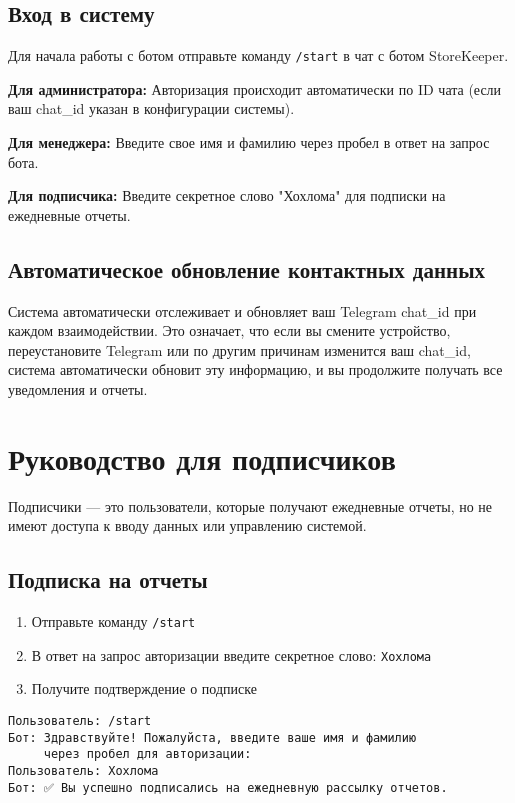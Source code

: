 \documentclass[a4paper,12pt]{article}
\begin{document}
\subsection{Вход в систему}
Для начала работы с ботом отправьте команду \texttt{/start} в чат с ботом StoreKeeper.

\begin{tcolorbox}[colback=gray!10, title=Авторизация]
\textbf{Для администратора:} Авторизация происходит автоматически по ID чата (если ваш chat\_id указан в конфигурации системы).

\textbf{Для менеджера:} Введите свое имя и фамилию через пробел в ответ на запрос бота.

\textbf{Для подписчика:} Введите секретное слово "Хохлома" для подписки на ежедневные отчеты.
\end{tcolorbox}

\subsection{Автоматическое обновление контактных данных}
Система автоматически отслеживает и обновляет ваш Telegram chat\_id при каждом взаимодействии. Это означает, что если вы смените устройство, переустановите Telegram или по другим причинам изменится ваш chat\_id, система автоматически обновит эту информацию, и вы продолжите получать все уведомления и отчеты.

\section{Руководство для подписчиков}

Подписчики — это пользователи, которые получают ежедневные отчеты, но не имеют доступа к вводу данных или управлению системой.

\subsection{Подписка на отчеты}
\begin{enumerate}
    \item Отправьте команду \texttt{/start}
    \item В ответ на запрос авторизации введите секретное слово: \texttt{Хохлома}
    \item Получите подтверждение о подписке
\end{enumerate}

\begin{tcolorbox}[colback=blue!5, title=Пример подписки]
\begin{verbatim}
Пользователь: /start
Бот: Здравствуйте! Пожалуйста, введите ваше имя и фамилию 
     через пробел для авторизации:
Пользователь: Хохлома
Бот: ✅ Вы успешно подписались на ежедневную рассылку отчетов.
\end{verbatim}
\end{tcolorbox}
\end{document}
